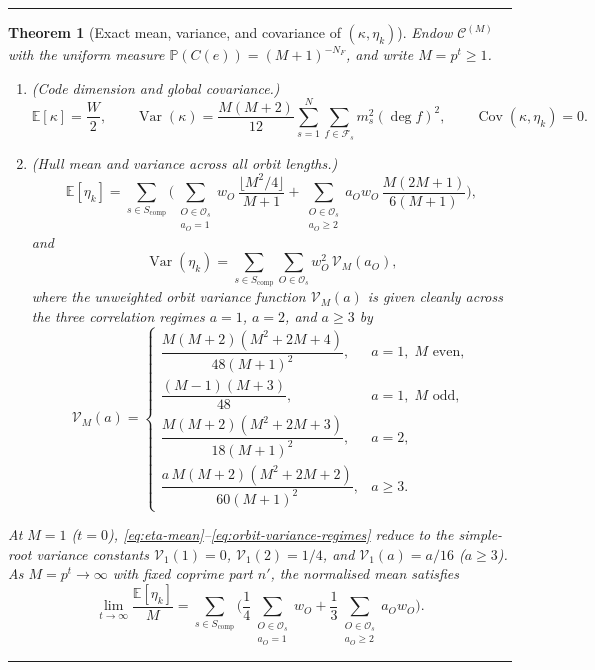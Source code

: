 \documentclass[preprint,12pt]{elsarticle}
\newcommand{\Fs}{\mathcal F_s}
\newcommand{\Os}{\mathcal O_s}
\newcommand{\Var}{\operatorname{Var}}
\newcommand{\Cov}{\operatorname{Cov}}
\numberwithin{equation}{section}
\theoremstyle{plain}
\newtheorem{theorem}{Theorem}[section]
\theoremstyle{definition}
\theoremstyle{remark}
\newenvironment{keyresult}
  {\par\addvspace{3pt}\noindent\rule{\linewidth}{0.4pt}\par\nobreak\addvspace{3pt}}
  {\par\nobreak\addvspace{3pt}\noindent\rule{\linewidth}{0.4pt}\par\addvspace{3pt}}
\begin{document}
\begin{keyresult}
\begin{theorem}[Exact mean, variance, and covariance of $(\kappa,\eta_k)$]\label{thm:moments}
Endow $\mathscr C^{(M)}$ with the uniform measure $\mathbb P(C(e))=(M+1)^{-N_F}$,
and write $M=p^t\ge 1$.
\begin{enumerate}
\item[\textup{(a)}] \emph{(Code dimension and global covariance.)}
\begin{equation}\label{eq:kappa-moments-cov}
\mathbb E[\kappa]=\frac{W}{2},
\qquad
\Var(\kappa)=\frac{M(M+2)}{12}\sum_{s=1}^{N}\sum_{f\in\Fs} m_s^2(\deg f)^2,
\qquad
\Cov(\kappa,\eta_k)=0.
\end{equation}
\item[\textup{(b)}] \emph{(Hull mean and variance across all orbit lengths.)}
\begin{equation}\label{eq:eta-mean}
\mathbb E[\eta_k]
 =\sum_{s\in S_{\mathrm{comp}}}\Biggl(
    \sum_{\substack{O\in\Os\\ a_O=1}} w_O\,\frac{\lfloor M^2/4\rfloor}{M+1}
   +\sum_{\substack{O\in\Os\\ a_O\ge 2}} a_O w_O\,\frac{M(2M+1)}{6(M+1)}
  \Biggr),
\end{equation}
and
\begin{equation}\label{eq:eta-variance}
\Var(\eta_k)=\sum_{s\in S_{\mathrm{comp}}}\sum_{O\in\Os} w_O^2\,\mathcal V_M(a_O),
\end{equation}
where the unweighted orbit variance function $\mathcal V_M(a)$ is given cleanly
across the three correlation regimes $a=1$, $a=2$, and $a\ge 3$ by
\begin{equation}\label{eq:orbit-variance-regimes}
\mathcal V_M(a)=
\begin{cases}
\dfrac{M(M+2)(M^2+2M+4)}{48(M+1)^2}, & a=1,\;M\text{ even},\\[9pt]
\dfrac{(M-1)(M+3)}{48}, & a=1,\;M\text{ odd},\\[9pt]
\dfrac{M(M+2)(M^2+2M+3)}{18(M+1)^2}, & a=2,\\[9pt]
\dfrac{a\,M(M+2)(M^2+2M+2)}{60(M+1)^2}, & a\ge 3.
\end{cases}
\end{equation}
\end{enumerate}
At $M=1$ ($t=0$), \eqref{eq:eta-mean}--\eqref{eq:orbit-variance-regimes} reduce to
the simple-root variance constants $\mathcal V_1(1)=0$, $\mathcal V_1(2)=1/4$,
and $\mathcal V_1(a)=a/16$ ($a\ge 3$). As $M=p^t\to\infty$ with fixed
coprime part $n'$, the normalised mean satisfies
\[
\lim_{t\to\infty}\frac{\mathbb E[\eta_k]}{M}
 =\sum_{s\in S_{\mathrm{comp}}}\Biggl(
    \frac{1}{4}\sum_{\substack{O\in\Os\\ a_O=1}} w_O
   +\frac{1}{3}\sum_{\substack{O\in\Os\\ a_O\ge 2}} a_O w_O
  \Biggr).
\]
\end{theorem}
\end{keyresult}
\end{document}

